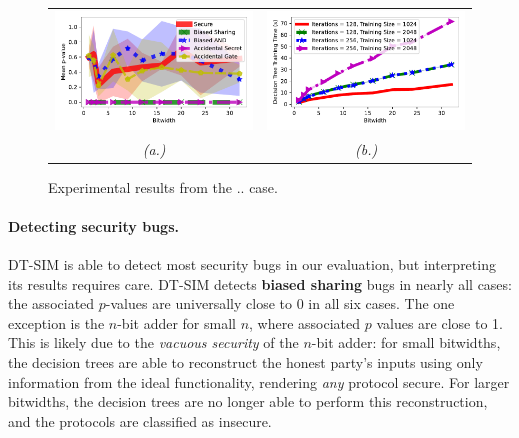 \documentclass[acmlarge, manuscript, screen, review, anonymous, table]{acmart}
\newcommand{\toolname}{\textsc{DT-SIM}\xspace}
\begin{document}
\begin{figure}
  \centering
  \newcommand{\gsize}{.45\textwidth}
\begin{tabular}{c c}
    \includegraphics[width=\gsize]{graphs/security_beaver_triple_gen_gmw_128_1024.pdf} &
    \includegraphics[width=\gsize]{graphs/time_beaver_triple_gen_gmw_256_2048.pdf} \\
    \textit{(a.)} & \textit{(b.)}
\end{tabular}
\caption{Experimental results from the .. case.}
\label{fig:observations-detail}
\end{figure}




\paragraph{Detecting security bugs.}
\toolname is able to detect most security bugs in our evaluation, but interpreting its results requires care. \toolname detects \textbf{biased sharing} bugs in nearly all cases: the associated $p$-values are universally close to 0 in all six cases. The one exception is the $n$-bit adder for small $n$, where associated $p$ values are close to 1. This is likely due to the \emph{vacuous security} of the $n$-bit adder: for small bitwidths, the decision trees are able to reconstruct the honest party's inputs using only information from the ideal functionality, rendering \emph{any} protocol secure. For larger bitwidths, the decision trees are no longer able to perform this reconstruction, and the protocols are classified as insecure.
\end{document}
